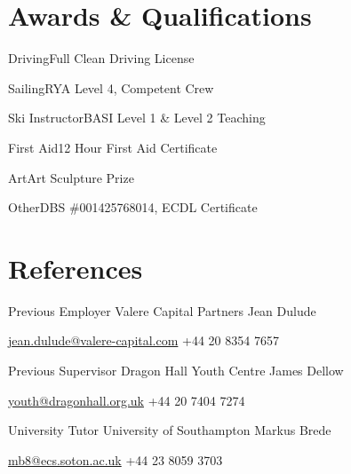 \documentclass{tccv}
\begin{document}
\vfill

\section{Awards \& Qualifications}

\begin{factlist}
\item{Driving}{Full Clean Driving License}
\item{Sailing}{RYA Level 4, Competent Crew}
\item{Ski Instructor}{BASI Level 1 \& Level 2 Teaching}
\item{First Aid}{12 Hour First Aid Certificate}
\item{Art}{Art Sculpture Prize}
\item{Other}{DBS \#001425768014, ECDL Certificate}
\end{factlist}


\section{References}

\begin{eventlist}

\item{Previous Employer}
     {Valere Capital Partners}
     {Jean Dulude}

\href{mailto:jean.dulude@valere-capital.com}{jean.dulude@valere-capital.com}
\newline
+44 20 8354 7657

\bigskip

     
\item{Previous Supervisor}
     {Dragon Hall Youth Centre}
     {James Dellow}

\href{mailto:youth@dragonhall.org.uk}{youth@dragonhall.org.uk}
\newline
+44 20 7404 7274

\bigskip


\item{University Tutor}
     {University of Southampton}
     {Markus Brede}

\href{mailto:mb8@ecs.soton.ac.uk}{mb8@ecs.soton.ac.uk}
\newline
+44 23 8059 3703

\end{eventlist}
\end{document}
